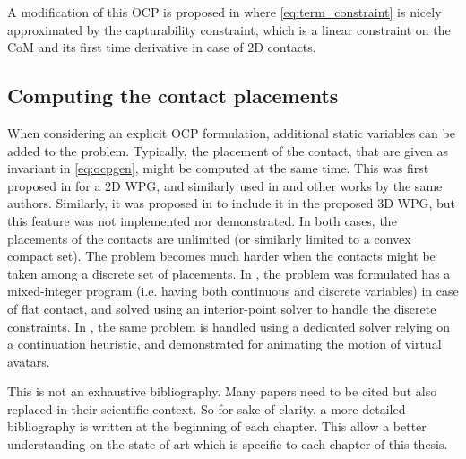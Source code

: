 A modification of this OCP is proposed in \cite{Sherikov:ichr:2014} where \eqref{eq:term_constraint} is nicely approximated by the capturability constraint, which is a linear constraint on the CoM and its first time derivative in case of 2D contacts.

\subsection*{Computing the contact placements}

When considering an explicit OCP formulation, additional static variables can be added to the problem.
Typically, the placement of the contact, that are given as invariant in \eqref{eq:ocpgen}, might be computed at the same time.
This was first proposed in \cite{herdt:ar:2010} for a 2D WPG, and similarly used in \cite{Sherikov:ichr:2014} and other works by the same authors.
Similarly, it was proposed in \cite{rotella_humanoid15} to include it in the proposed 3D WPG, but this feature was not implemented nor demonstrated.
In both cases, the placements of the contacts are unlimited (or similarly limited to a convex compact set).
The problem becomes much harder when the contacts might be taken among a discrete set of placements.
In \cite{deits:ichr:14}, the problem was formulated has a mixed-integer program (i.e. having both continuous and discrete variables) in case of flat contact, and solved using an interior-point solver to handle the discrete constraints.
In \cite{mordatch:tog:12}, the same problem is handled using a dedicated solver relying on a continuation heuristic, and demonstrated for animating the motion of virtual avatars.

This is not an exhaustive bibliography.
Many papers need to be cited but also replaced in their scientific context.
So for sake of clarity, a more detailed bibliography is written at the beginning of each chapter.
This allow a better understanding on the state-of-art which is specific to each chapter of this thesis.

